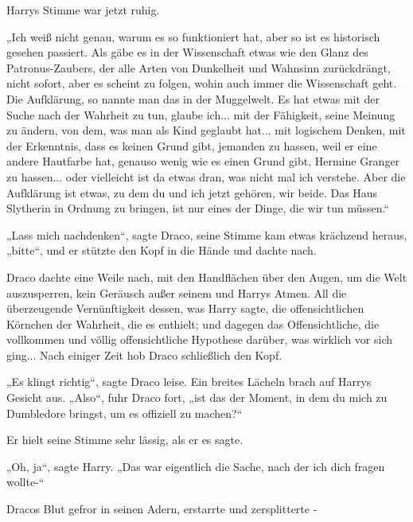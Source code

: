 {Harrys Stimme war jetzt ruhig.

„Ich weiß nicht genau, warum es so funktioniert hat, aber so ist es historisch gesehen passiert. Als gäbe es in der Wissenschaft etwas wie den Glanz des Patronus-Zaubers, der alle Arten von Dunkelheit und Wahnsinn zurückdrängt, nicht sofort, aber es scheint zu folgen, wohin auch immer die Wissenschaft geht. Die Aufklärung, so nannte man das in der Muggelwelt. Es hat etwas mit der Suche nach der Wahrheit zu tun, glaube ich... mit der Fähigkeit, seine Meinung zu ändern, von dem, was man als Kind geglaubt hat... mit logischem Denken, mit der Erkenntnis, dass es keinen Grund gibt, jemanden zu hassen, weil er eine andere Hautfarbe hat, genauso wenig wie es einen Grund gibt, Hermine Granger zu hassen... oder vielleicht ist da etwas dran, was nicht mal ich verstehe. Aber die Aufklärung ist etwas, zu dem du und ich jetzt gehören, wir beide. Das Haus Slytherin in Ordnung zu bringen, ist nur eines der Dinge, die wir tun müssen.“

„Lass mich nachdenken“, sagte Draco, seine Stimme kam etwas krächzend heraus, „bitte“, und er stützte den Kopf in die Hände und dachte nach.

Draco dachte eine Weile nach, mit den Handflächen über den Augen, um die Welt auszusperren, kein Geräusch außer seinem und Harrys Atmen. All die überzeugende Vernünftigkeit dessen, was Harry sagte, die offensichtlichen Körnchen der Wahrheit, die es enthielt; und dagegen das Offensichtliche, die vollkommen und völlig offensichtliche Hypothese darüber, was wirklich vor sich ging... Nach einiger Zeit hob Draco schließlich den Kopf.

„Es klingt richtig“, sagte Draco leise. Ein breites Lächeln brach auf Harrys Gesicht aus. „Also“, fuhr Draco fort, „ist das der Moment, in dem du mich zu Dumbledore bringst, um es offiziell zu machen?“

Er hielt seine Stimme sehr lässig, als er es sagte.

„Oh, ja“, sagte Harry. „Das war eigentlich die Sache, nach der ich dich fragen wollte-“

Dracos Blut gefror in seinen Adern, erstarrte und zersplitterte -

}
